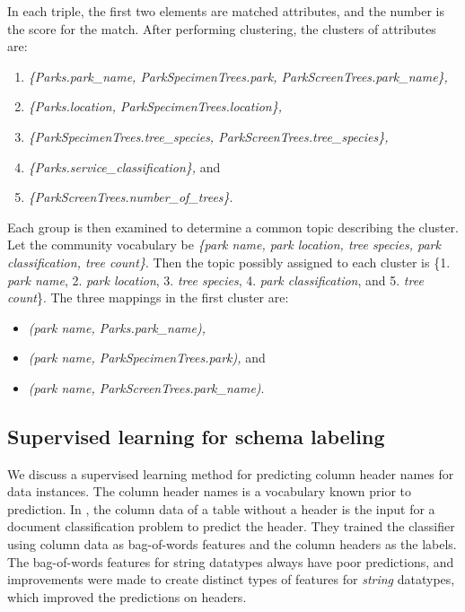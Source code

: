In each triple, the first two elements are matched attributes, and the number is the score for the match. After performing clustering, the clusters of attributes are:
\begin{enumerate}
	\item \textit{\{Parks.park\_name, ParkSpecimenTrees.park, ParkScreenTrees.park\_name\},}
	\item \textit{\{Parks.location, ParkSpecimenTrees.location\},}
	\item \textit{\{ParkSpecimenTrees.tree\_species, ParkScreenTrees.tree\_species\},}
	\item \textit{\{Parks.service\_classification\},} and
	\item \textit{\{ParkScreenTrees.number\_of\_trees\}}.
\end{enumerate}

Each group is then examined to determine a common topic describing the cluster. Let the community vocabulary be \textit{\{park name, park location, tree species, park classification, tree count\}}. Then the topic possibly assigned to each cluster is \{1. \textit{park name}, 2. \textit{park location}, 3. \textit{tree species}, 4. \textit{park classification}, and 5. \textit{tree count}\}. The three mappings in the first cluster are:
\begin{itemize}
	\item[] \textit{(park name, Parks.park\_name),}
	\item[] \textit{(park name, ParkSpecimenTrees.park),} and
	\item[] \textit{(park name, ParkScreenTrees.park\_name)}.
\end{itemize}

\subsection{Supervised learning for schema labeling}
\label{ssec:SupervisedLearningForSchemaLabeling}

We discuss a supervised learning method for predicting column header names for data instances. The column header names is a vocabulary known prior to prediction. In \cite{10.1145/3184558.3191601}, the column data of a table without a header is the input for a document classification problem to predict the header. They trained the classifier using column data as bag-of-words features and the column headers as the labels. The bag-of-words features for string datatypes always have poor predictions, and improvements were made to create distinct types of features for \textit{string} datatypes, which improved the predictions on headers.

